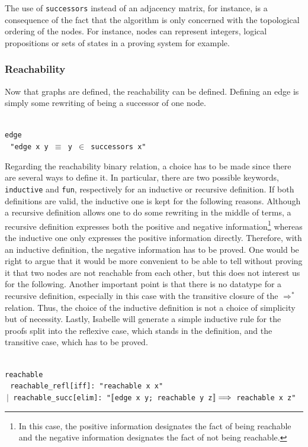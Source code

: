 \documentclass[a4 paper, 12pt]{article}
\newcommand{\ldb}{\mathopen{\ooalign{\makebox[.4em][l]{$\lbrack$}\cr\makebox[.4em][r]{$\lbrack$}\cr}}}
\newcommand{\rdb}{\mathclose{\ooalign{\makebox[.4em][l]{$\rbrack$}\cr\makebox[.4em][r]{$\rbrack$}\cr}}}
\newcommand{\inductive}{{\color{isa_blue}{inductive}}}
\newcommand{\abbreviation}{{\color{isa_blue}{abbreviation}}}
\newcommand{\where}{{\color{isa_green}{where}}}
\newcommand{\isa}[1]{\small\texttt{\\\noindent#1}}
\theoremstyle{definition}
\begin{document}
The use of \texttt{successors} instead of an adjacency matrix, for instance, is a consequence of the fact that the algorithm is only concerned with the topological ordering of the nodes. For instance, nodes can represent integers, logical propositions or sets of states in a proving system for example.

\subsubsection{Reachability}
Now that graphs are defined, the reachability can be defined. Defining an edge is simply some rewriting of being a successor of one node.

\isa{
    \abbreviation{} edge \where\\
    $~~~$"{\color{isa_dark_blue}edge} {\color{isa_dark_green}x y} $\equiv$ {\color{isa_dark_green}y} $\in$ {\color{isa_dark_blue}successors} {\color{isa_dark_green}x}"
}
\BlankLine
\BlankLine
\BlankLine
\BlankLine

\noindent
Regarding the reachability binary relation, a choice has to be made since there are several ways to define it. In particular, there are two possible keywords, {\color{isa_blue}\texttt{inductive}} and {\color{isa_blue}\texttt{fun}}, respectively for an inductive or recursive definition. If both definitions are valid, the inductive one is kept for the following reasons. Although a recursive definition allows one to do some rewriting in the middle of terms, a recursive definition expresses both the positive and negative information\footnote{In this case, the positive information designates the fact of being reachable and the negative information designates the fact of not being reachable.} whereas the inductive one only expresses the positive information directly. Therefore, with an inductive definition, the negative information has to be proved. One would be right to argue that it would be more convenient to be able to tell without proving it that two nodes are not reachable from each other, but this does not interest us for the following. Another important point is that there is no datatype for a recursive definition, especially in this case with the transitive closure of the $\Rightarrow^*$ relation. Thus, the choice of the inductive definition is not a choice of simplicity but of necessity. Lastly, Isabelle will generate a simple inductive rule for the proofs split into the reflexive case, which stands in the definition, and the transitive case, which has to be proved.

\isa{
    \inductive{} reachable \where\\
    $~~~$reachable\_refl[iff]: "{\color{isa_dark_blue}reachable} {\color{isa_dark_green}x x}"\\
    $~{\text{|}}$ reachable\_succ[elim]: "$\ldb$edge {\color{isa_dark_green}x y};  {\color{isa_dark_blue}reachable} {\color{isa_dark_green}y z}$\rdb \Longrightarrow$ {\color{isa_dark_blue}reachable} {\color{isa_dark_green}x z}"\\
}
\end{document}
